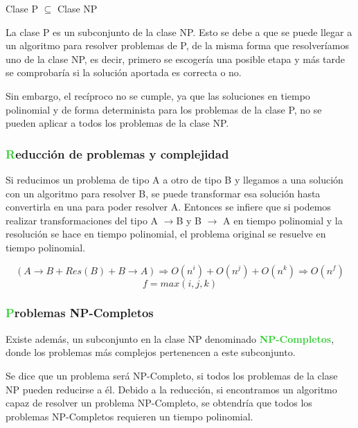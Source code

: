 \documentclass[10pt,a4paper,spanish]{report}
\theoremstyle{definition}
\theoremstyle{remark}
\begin{document}
    \begin{center}
    {\Large{Clase P $\subseteq$ Clase NP\\}}
    \end{center}
    
    La clase P es un subconjunto de la clase NP. Esto se debe a que se puede llegar a un algoritmo para resolver problemas de P, de la misma forma que resolveríamos uno de la clase NP, es decir, primero se escogería una posible etapa y más tarde se comprobaría si la solución aportada es correcta o no.

    Sin embargo, el recíproco no se cumple, ya que las soluciones en tiempo polinomial y de forma determinista para los problemas de la clase P, no se pueden aplicar a todos los problemas de la clase NP.

    \subsubsection{\textcolor{LimeGreen}Reducción de problemas y complejidad}
    
    Si reducimos un problema de tipo A a otro de tipo B y llegamos a una solución con un algoritmo para resolver B, se puede transformar esa solución hasta convertirla en una para poder resolver A. Entonces se infiere que si podemos realizar transformaciones del tipo A $\rightarrow$B y B $\rightarrow$ A en tiempo polinomial y la resolución se hace en tiempo polinomial, el problema original se resuelve en tiempo polinomial.

    \begin{displaymath}
        (A \rightarrow B + Res(B) + B \rightarrow A) \Rightarrow O(n^i) + O(n^j) + O(n^k) \Rightarrow O(n^f)
    \end{displaymath}
    \begin{displaymath}
        f = max(i, j, k)
    \end{displaymath}

    \subsubsection{\textcolor{LimeGreen}Problemas NP-Completos}

    Existe además, un subconjunto en la clase NP denominado \textbf{\textcolor{LimeGreen}{NP-Completos}}, donde los problemas más complejos pertenencen a este subconjunto.

    Se dice que un problema será NP-Completo, si todos los problemas de la clase NP pueden reducirse a él. Debido a la reducción, si encontramos un algoritmo capaz de resolver un problema NP-Completo, se obtendría que todos los problemas NP-Completos requieren un tiempo polinomial.
    
\end{document}
